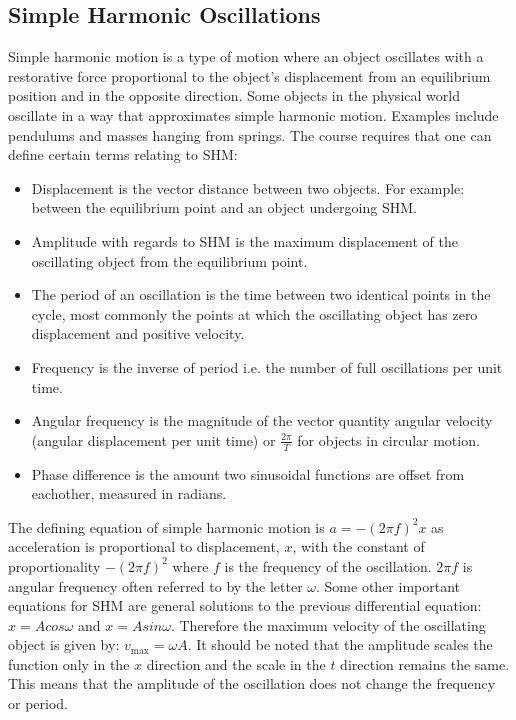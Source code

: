 \documentclass[a4,8pt]{article}
\begin{document}
\subsection{Simple Harmonic Oscillations}
Simple harmonic motion is a type of motion where an object oscillates with a 
restorative force proportional to the object's displacement from an equilibrium 
position and in the opposite direction. Some objects in the physical world 
oscillate in a way that approximates simple harmonic motion. Examples include 
pendulums and masses hanging from springs. The course requires that one can 
define certain terms relating to SHM:\@
\begin{itemize}
	\item Displacement is the vector distance between two objects. For example: 
    between the equilibrium point and an object undergoing SHM.\@
	\item Amplitude with regards to SHM is the maximum displacement of the 
    oscillating object from the equilibrium point.
	\item The period of an oscillation is the time between two identical points 
    in the cycle, most commonly the points at which the oscillating object has 
    zero displacement and positive velocity.
	\item Frequency is the inverse of period i.e. the number of full 
    oscillations per unit time.
	\item Angular frequency is the magnitude of the vector quantity angular 
    velocity (angular displacement per unit time) or $\frac{2\pi}{T}$ for 
    objects in circular motion.
	\item Phase difference is the amount two sinusoidal functions are offset 
    from eachother, measured in radians.
\end{itemize}

The defining equation of simple harmonic motion is $a=-{(2\pi f)}^2 x$ as 
acceleration is proportional to displacement, $x$, with the constant of 
proportionality $-{(2\pi f)}^2$ where $f$ is the frequency of the oscillation. 
$2\pi f$ is angular frequency often referred to by the letter $\omega$. Some 
other important equations for SHM are general solutions to the previous 
differential equation: $x=Acos\omega$ and $x=Asin\omega$. Therefore the maximum 
velocity of the oscillating object is given by: $v_\text{max}=\omega A$. It 
should be noted that the amplitude scales the function only in the $x$ direction 
and the scale in the $t$ direction remains the same. This means that the 
amplitude of the oscillation does not change the frequency or period.
\vspace{8pt}
\end{document}
